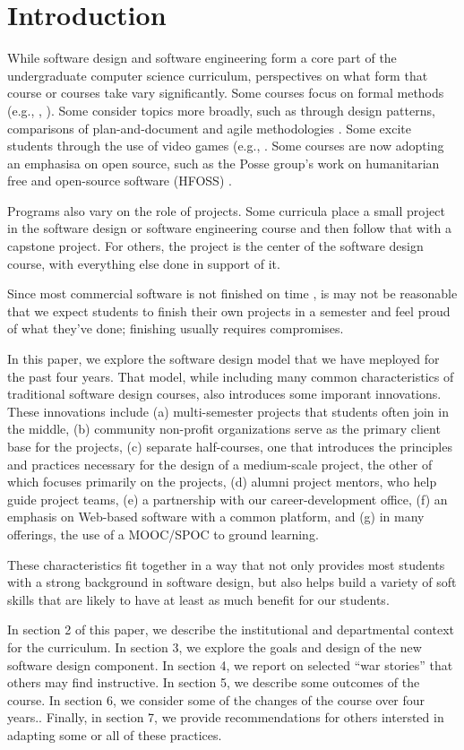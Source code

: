 
\section{Introduction}

While software design and software engineering form a core part of
the undergraduate computer science curriculum, perspectives on what
form that course or courses take vary significantly.  Some courses
focus on formal methods (e.g., \cite{liu-2009}, \cite{gracia-2014}).
Some consider topics more broadly, such as through design patterns,
comparisons of plan-and-document and agile methodologies
\cite{gestwicki-2018}.  Some excite students through the use of
video games (e.g., \cite{wolz-2007}.  Some courses are now adopting
an emphasisa on open source, such as the Posse group's work on
humanitarian free and open-source software (HFOSS) \cite{hfoss-2018}.

Programs also vary on the role of projects.  Some curricula place
a small project in the software design or software engineering
course and then follow that with a capstone project.  For others,
the project is the center of the software design course, with
everything else done in support of it.

Since most commercial software is not finished on time \cite{fox-2014},
is may not be reasonable that we expect students to finish their own projects
in a semester and feel proud of what they've done; finishing usually
requires compromises.

In this paper, we explore the software design model that we have
meployed for the past four years.  That model, while including many
common characteristics of traditional software design courses, also
introduces some imporant innovations.  These innovations include
(a) multi-semester projects that students often join in the middle,
(b) community non-profit organizations serve as the primary client
base for the projects, (c) separate half-courses, one that introduces
the principles and practices necessary for the design of a medium-scale
project, the other of which focuses primarily on the projects, (d)
alumni project mentors, who help guide project teams, (e) a partnership
with our career-development office, (f) an emphasis on Web-based
software with a common platform, and (g) in many offerings, the use
of a MOOC/SPOC to ground learning.

These characteristics fit together in a way that not only provides
most students with a strong background in software design, but also
helps build a variety of soft skills that are likely to have at
least as much benefit for our students.

In section 2 of this paper, we describe the institutional and
departmental context for the curriculum.  In section 3, we explore
the goals and design of the new software design component.  In
section 4, we report on selected ``war stories'' that others may
find instructive.  In section 5, we describe some outcomes of the
course.  In section 6, we consider some of the changes of the course
over four years..  Finally, in section 7, we provide recommendations
for others intersted in adapting some or all of these practices.

